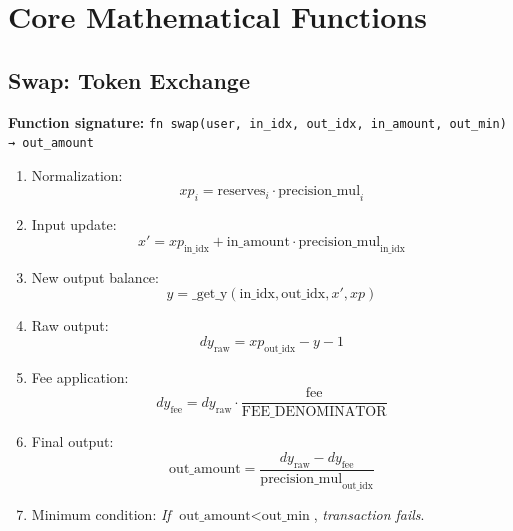 \documentclass[12pt]{article}
\begin{document}
\section{Core Mathematical Functions}

\subsection{Swap: Token Exchange}

\textbf{Function signature:} \verb|fn swap(user, in_idx, out_idx, in_amount, out_min) → out_amount|

\begin{enumerate}
    \item Normalization:
    \begin{equation}
    xp_i = \text{reserves}_i \cdot \text{precision\_mul}_i
    \end{equation}

    \item Input update:
    \begin{equation}
    x' = xp_{\text{in\_idx}} + \text{in\_amount} \cdot \text{precision\_mul}_{\text{in\_idx}}
    \end{equation}

    \item New output balance:
    \begin{equation}
    y = \text{\_get\_y}(\text{in\_idx}, \text{out\_idx}, x', xp)
    \end{equation}

    \item Raw output:
    \begin{equation}
    dy_{\text{raw}} = xp_{\text{out\_idx}} - y - 1
    \end{equation}

    \item Fee application:
    \begin{equation}
    dy_{\text{fee}} = dy_{\text{raw}} \cdot \frac{\text{fee}}{\text{FEE\_DENOMINATOR}}
    \end{equation}

    \item Final output:
    \begin{equation}
    \text{out\_amount} = \frac{dy_{\text{raw}} - dy_{\text{fee}}}{\text{precision\_mul}_{\text{out\_idx}}}
    \end{equation}

    \item Minimum condition:
    \textit{If} $\text{out\_amount} < \text{out\_min}$, \textit{transaction fails}.
\end{enumerate}
\end{document}
